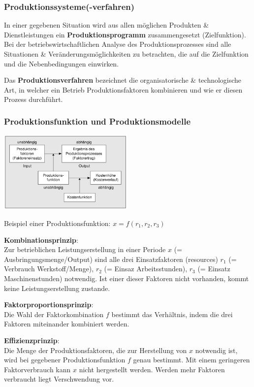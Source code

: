 \documentclass[11pt]{article}
\begin{document}
\subsubsection{Produktionssysteme(-verfahren)}
\label{sec:orgb005cb3}
In einer gegebenen Situation wird aus allen möglichen Produkten \& Dienstleistungen ein \textbf{Produktionsprogramm} zusammengesetzt (Zielfunktion). Bei der betriebswirtschaftlichen Analyse des Produktionsprozesses sind alle Situationen \& Veränderungsmöglichkeiten zu betrachten, die auf die Zielfunktion und die Nebenbedingungen einwirken.

Das \textbf{Produktionsverfahren} bezeichnet die organisatorische \& technologische Art, in welcher ein Betrieb Produktionsfaktoren kombinieren und wie er diesen Prozess durchführt.

\subsubsection{Produktionsfunktion und Produktionsmodelle}
\label{sec:org7f14b3d}
\begin{center}
\includegraphics[width=250px]{./pictures/prodfunktion.png}
\end{center} 

Beispiel einer Produktionsfunktion: \(x=f(r_1, r_2, r_3)\)

\textbf{Kombinationsprinzip}:\\
Zur betrieblichen Leistungserstellung in einer Periode \(x\) (= Ausbringungsmenge/Output) sind alle drei Einsatzfaktoren (resources) \(r_1\) (= Verbrauch Werkstoff/Menge), \(r_2\) (= Einsaz Arbeitsstunden), \(r_3\) (= Einsatz Maschinenstunden) notwendig. Ist einer dieser Faktoren nicht vorhanden, kommt keine Leistungserstellung zustande.

\textbf{Faktorproportionsprinzip}:\\
Die Wahl der Faktorkombination \(f\) bestimmt das Verhältnis, indem die drei Faktoren miteinander kombiniert werden.

\textbf{Effizienzprinzip}:\\
Die Menge der Produktionsfaktoren, die zur Herstellung von \(x\) notwendig ist, wird bei gegebener Produktionsfunktion \(f\) genau bestimmt. Mit einem geringeren Faktorverbrauch kann \(x\) nicht hergestellt werden. Werden mehr Faktoren verbraucht liegt Verschwendung vor.
\end{document}
